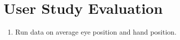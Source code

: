 \section{User Study Evaluation}
\begin{enumerate}
	\item Run data on average eye position and hand position. 
\end{enumerate}
